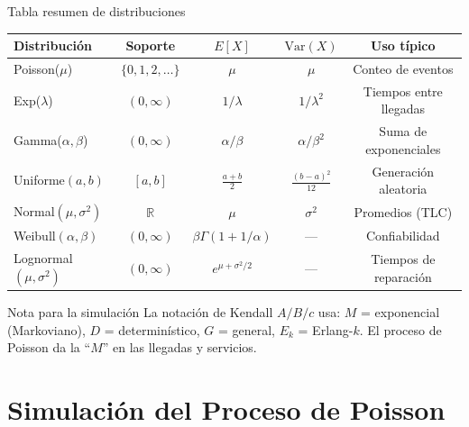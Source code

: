 \documentclass[aspectratio=1610, 9pt]{beamer}
\begin{document}
\begin{frame}{Tabla resumen de distribuciones}

\begin{center}
\renewcommand{\arraystretch}{1.3}
\small
\begin{tabular}{lcccc}
\toprule
\textbf{Distribuci\'{o}n} & \textbf{Soporte} & $E[X]$ & $\text{Var}(X)$ & \textbf{Uso t\'{i}pico} \\
\midrule
Poisson($\mu$) & $\{0,1,2,\ldots\}$ & $\mu$ & $\mu$ & Conteo de eventos \\
Exp($\lambda$) & $(0,\infty)$ & $1/\lambda$ & $1/\lambda^2$ & Tiempos entre llegadas \\
Gamma($\alpha,\beta$) & $(0,\infty)$ & $\alpha/\beta$ & $\alpha/\beta^2$ & Suma de exponenciales \\
Uniforme$(a,b)$ & $[a,b]$ & $\frac{a+b}{2}$ & $\frac{(b-a)^2}{12}$ & Generaci\'{o}n aleatoria \\
Normal$(\mu,\sigma^2)$ & $\mathbb{R}$ & $\mu$ & $\sigma^2$ & Promedios (TLC) \\
Weibull$(\alpha,\beta)$ & $(0,\infty)$ & $\beta\Gamma(1\!+\!1/\alpha)$ & --- & Confiabilidad \\
Lognormal$(\mu,\sigma^2)$ & $(0,\infty)$ & $e^{\mu+\sigma^2/2}$ & --- & Tiempos de reparaci\'{o}n \\
\bottomrule
\end{tabular}
\end{center}

\vspace{0.3cm}
\begin{alertblock}{Nota para la simulaci\'{o}n}
La notaci\'{o}n de Kendall $A/B/c$ usa: $M$ = exponencial (Markoviano), $D$ = determin\'{i}stico, $G$ = general, $E_k$ = Erlang-$k$. El proceso de Poisson da la ``$M$'' en las llegadas y servicios.
\end{alertblock}
\end{frame}

\section{Simulaci\'{o}n del Proceso de Poisson}
\end{document}
